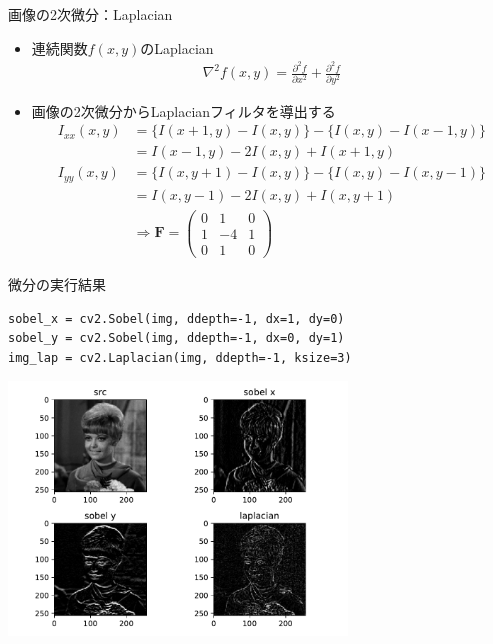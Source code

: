 \documentclass[10pt]{beamer}
\begin{document}
	\begin{frame}{画像の2次微分：Laplacian}
	    \begin{itemize}
	        \item 連続関数$f(x, y)$のLaplacian
	            \begin{align*}
	                \nabla^2f(x,y)
	                = \frac{\partial^2f}{\partial x^2}
	                + \frac{\partial^2f}{\partial y^2}
	            \end{align*}
	        \item 画像の2次微分からLaplacianフィルタを導出する
	            \begin{align*}
	                I_{xx}(x, y) &= \{I(x + 1, y) - I(x, y)\} - \{I(x, y) - I(x-1, y)\} \\
	                             &= I(x-1,y) - 2I(x,y) + I(x+1,y) \\
	                I_{yy}(x, y) &= \{I(x, y + 1) - I(x, y)\} - \{I(x, y) - I(x, y-1)\} \\
	                             &= I(x,y-1) - 2I(x,y) + I(x,y+1) \\
	                             &\Longrightarrow
	                \bm F = 
        	        \begin{pmatrix}
        	            0   &1  &0  \\
        	            1   &-4  &1  \\
        	            0   &1  &0  
        	        \end{pmatrix}
	            \end{align*}
	    \end{itemize}
	\end{frame}
	
	\begin{frame}[fragile]{微分の実行結果}
	    \scriptsize
	    \begin{verbatim}
sobel_x = cv2.Sobel(img, ddepth=-1, dx=1, dy=0)
sobel_y = cv2.Sobel(img, ddepth=-1, dx=0, dy=1)
img_lap = cv2.Laplacian(img, ddepth=-1, ksize=3)
	    \end{verbatim}
	    \begin{center}
    		\includegraphics[width=9cm]{./figs/derivative.pdf}
		\end{center}
	\end{frame}
	
\end{document}
